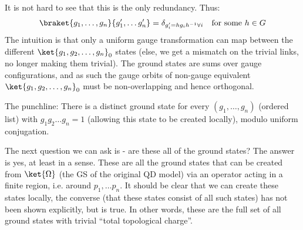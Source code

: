 It is not hard to see that this is the only redundancy. Thus:
\begin{equation}
    \braket{g_1, \ldots, g_n}{g_1', \ldots g_n'} = \delta_{g_i' = hg_i h^{-1} \forall i} \quad \text{for some $h \in G$}
\end{equation}
The intuition is that only a uniform gauge transformation can map between the different $\ket{g_1, g_2, \ldots, g_n}_0$ states (else, we get a mismatch on the trivial links, no longer making them trivial). The ground states are sums over gauge configurations, and as such the gauge orbits of non-gauge equivalent $\ket{g_1, g_2, \ldots, g_n}_0$ must be non-overlapping and hence orthogonal.

The punchline: There is a distinct ground state for every $(g_1, \ldots, g_n)$ (ordered list) with $g_1g_2\ldots g_n = 1$ (allowing this state to be created locally), modulo uniform conjugation.

The next question we can ask is - are these all of the ground states? The answer is yes, at least in a sense. These are all the ground states that can be created from $\ket{\Omega}$ (the GS of the original QD model) via an operator acting in a finite region, i.e. around $p_1, \ldots p_n$. It should be clear that we can create these states locally, the converse (that these states consist of all such states) has not been shown explicitly, but is true. In other words, these are the full set of all ground states with trivial ``total topological charge''.

